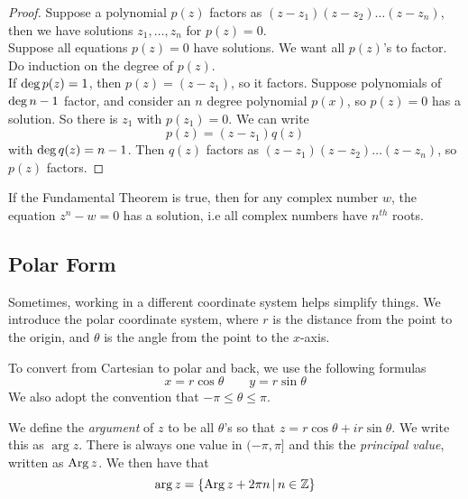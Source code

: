 \documentclass{article}
\begin{document}
	\begin{proof}
		Suppose a polynomial $p(z)$ factors as $(z-z_{1})(z-z_{2}) \dots (z-z_{n})$, then we have solutions $z_{1}, \dots ,z_{n}$ for $p(z)=0$.\\

		Suppose	all equations $p(z)=0$ have solutions. We want all $p(z)$'s to factor. Do induction on the degree of $p(z)$.\\

		If $\operatorname{deg} p(z) = 1$, then $p(z) = (z-z_{1})$, so it factors. Suppose polynomials of $\operatorname{deg} n-1$ factor, and consider an $n$ degree polynomial $p(x)$, so $p(z)=0$ has a solution. So there is $z_{1}$ with $p(z_{1})=0$. We can write
		\[
			p(z) = (z-z_1)q(z)
		\]
		with $\operatorname{deg} q(z) = n-1$. Then $q(z)$ factors as $(z-z_{1})(z-z_{2}) \dots (z-z_{n})$, so $p(z)$ factors.
	\end{proof}

	\begin{remark}
		If the Fundamental Theorem is true, then for any complex number $w$, the equation $z^n-w=0$ has a solution, i.e all complex numbers have $n^{th}$ roots.
	\end{remark}

	\subsection*{Polar Form}

	Sometimes, working in a different coordinate system helps simplify things. We introduce the polar coordinate system, where $r$ is the distance from the point to the origin, and $\theta$ is the angle from the point to the $x$-axis.

	\begin{center}
	\end{center}

	To convert from Cartesian to polar and back, we use the following formulas
	\[
		x = r\cos\theta \qquad y = r\sin\theta
	\]
	We also adopt the convention that $-\pi \leq \theta \leq \pi$.

	\begin{defi}[Argument]
		We define the \textit{argument} of $z$ to be all $\theta$'s so that $z = r\cos\theta + i r\sin\theta$. We write this as $\arg z$. There is always one value in $(-\pi,\pi]$ and this the \textit{principal value}, written as $\operatorname{Arg} z$. We then have that 
		\[
			\arg z = \{ \operatorname{Arg} z + 2\pi n \, | \, n \in \mathbb{Z} \}
		\]
	\end{defi}
\end{document}
